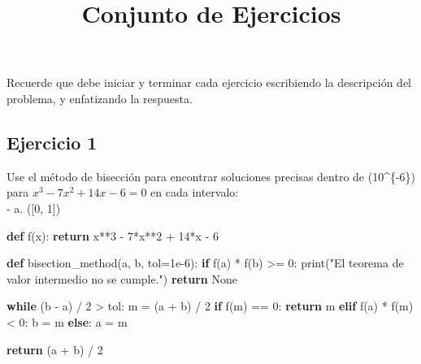 \documentclass[
  letterpaper,
  DIV=11,
  numbers=noendperiod]{scrartcl}
\title{Conjunto de Ejercicios}
\author{}
\date{}
\newenvironment{Shaded}{\begin{snugshade}}{\end{snugshade}}
\newcommand{\BuiltInTok}[1]{\textcolor[rgb]{0.00,0.23,0.31}{#1}}
\newcommand{\ControlFlowTok}[1]{\textcolor[rgb]{0.00,0.23,0.31}{\textbf{#1}}}
\newcommand{\DecValTok}[1]{\textcolor[rgb]{0.68,0.00,0.00}{#1}}
\newcommand{\FloatTok}[1]{\textcolor[rgb]{0.68,0.00,0.00}{#1}}
\newcommand{\KeywordTok}[1]{\textcolor[rgb]{0.00,0.23,0.31}{\textbf{#1}}}
\newcommand{\NormalTok}[1]{\textcolor[rgb]{0.00,0.23,0.31}{#1}}
\newcommand{\OperatorTok}[1]{\textcolor[rgb]{0.37,0.37,0.37}{#1}}
\newcommand{\StringTok}[1]{\textcolor[rgb]{0.13,0.47,0.30}{#1}}
\newcommand{\VariableTok}[1]{\textcolor[rgb]{0.07,0.07,0.07}{#1}}
\begin{document}
\maketitle


Recuerde que debe iniciar y terminar cada ejercicio escribiendo la
descripción del problema, y enfatizando la respuesta.

\subsection{Ejercicio 1}\label{ejercicio-1}

Use el método de bisección para encontrar soluciones precisas dentro de
(10\^{}\{-6\}) para \(x^3 - 7x^2 + 14x - 6 = 0\) en cada intervalo:\\
- a. ({[}0, 1{]})

\begin{Shaded}
\begin{Highlighting}[]
\KeywordTok{def}\NormalTok{ f(x):}
    \ControlFlowTok{return}\NormalTok{ x}\OperatorTok{**}\DecValTok{3} \OperatorTok{{-}} \DecValTok{7}\OperatorTok{*}\NormalTok{x}\OperatorTok{**}\DecValTok{2} \OperatorTok{+} \DecValTok{14}\OperatorTok{*}\NormalTok{x }\OperatorTok{{-}} \DecValTok{6}

\KeywordTok{def}\NormalTok{ bisection\_method(a, b, tol}\OperatorTok{=}\FloatTok{1e{-}6}\NormalTok{):}
    \ControlFlowTok{if}\NormalTok{ f(a) }\OperatorTok{*}\NormalTok{ f(b) }\OperatorTok{\textgreater{}=} \DecValTok{0}\NormalTok{:}
        \BuiltInTok{print}\NormalTok{(}\StringTok{"El teorema de valor intermedio no se cumple."}\NormalTok{)}
        \ControlFlowTok{return} \VariableTok{None}
    
    \ControlFlowTok{while}\NormalTok{ (b }\OperatorTok{{-}}\NormalTok{ a) }\OperatorTok{/} \DecValTok{2} \OperatorTok{\textgreater{}}\NormalTok{ tol:}
\NormalTok{        m }\OperatorTok{=}\NormalTok{ (a }\OperatorTok{+}\NormalTok{ b) }\OperatorTok{/} \DecValTok{2}
        \ControlFlowTok{if}\NormalTok{ f(m) }\OperatorTok{==} \DecValTok{0}\NormalTok{:}
            \ControlFlowTok{return}\NormalTok{ m}
        \ControlFlowTok{elif}\NormalTok{ f(a) }\OperatorTok{*}\NormalTok{ f(m) }\OperatorTok{\textless{}} \DecValTok{0}\NormalTok{:}
\NormalTok{            b }\OperatorTok{=}\NormalTok{ m}
        \ControlFlowTok{else}\NormalTok{:}
\NormalTok{            a }\OperatorTok{=}\NormalTok{ m}

    \ControlFlowTok{return}\NormalTok{ (a }\OperatorTok{+}\NormalTok{ b) }\OperatorTok{/} \DecValTok{2}


\end{Highlighting}
\end{Shaded}
\end{document}
